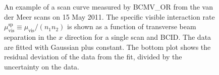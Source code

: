 \begin{figure}[htbp]
	\centering
	\caption{An example of a scan curve measured by BCMV\_OR from the van der Meer scans on 15 May 2011. The specific visible interaction rate $\mu_{\mathrm{vis}}^{\mathrm{sp}}\equiv \mu_{\mathrm{vis}}/(n_1n_2)$ is shown as a function of transverse beam separation in the $x$ direction for a single scan and BCID. The data are fitted with Gaussian plus constant. The bottom plot shows the residual deviation of the data from the fit, divided by the uncertainty on the data.}
	\label{fig:reco-vdm-curve}
\end{figure}

